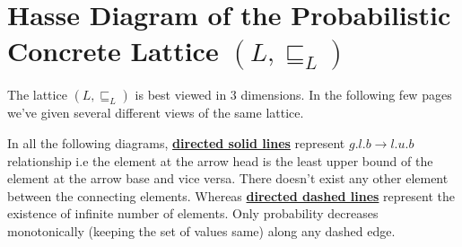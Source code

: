 \documentclass[final,3p, review, times]{Elsevier/elsarticle}
\begin{document}
\section{\\Hasse Diagram of the Probabilistic Concrete Lattice $(L,\sqsubseteq_L)$}
\label{app:concrete_hasse}

The lattice $(L,\sqsubseteq_L)$ is best viewed in 3 dimensions. In the following few pages we've given several different views of the same lattice.

In all the following diagrams, \underline{\textbf{directed solid lines}} represent $g.l.b\to l.u.b$ relationship i.e the element at the arrow head is the least upper bound of the element at the arrow base and vice versa. There doesn't exist any other element between the connecting elements. Whereas \underline{\textbf{directed dashed lines}} represent the existence of infinite number of elements. Only probability decreases monotonically (keeping the set of values same) along any dashed edge.
\end{document}
